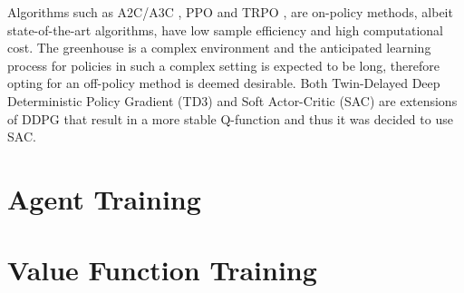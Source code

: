 Algorithms such as A2C/A3C \cite{mnihAsynchronousMethodsDeep2016}, PPO \cite{schulmanProximalPolicyOptimization2017} and TRPO \cite{schulmanTrustRegionPolicy2017}, are on-policy methods, albeit state-of-the-art algorithms, have low sample efficiency and high computational cost. The greenhouse is a complex environment and the anticipated  learning process for policies in such a complex setting is expected to be long, therefore opting for an off-policy method is deemed desirable. Both Twin-Delayed Deep Deterministic Policy Gradient (TD3) \cite{fujimotoAddressingFunctionApproximation2018} and Soft Actor-Critic (SAC) \cite{haarnojaSoftActorCriticOffPolicy2018} are extensions of DDPG that result in a more stable Q-function and thus it was decided to use SAC.

\section{Agent Training}

\section{Value Function Training}